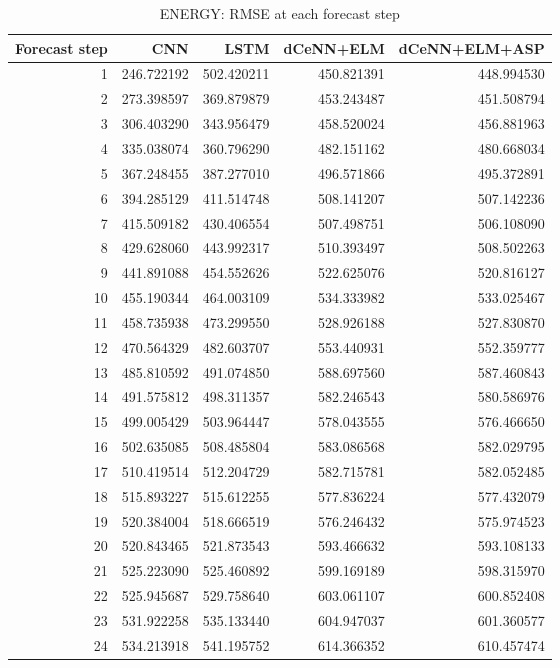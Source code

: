\begin{table}
\caption{ENERGY: RMSE at each forecast step}
\begin{tabular}{rrrrr}
\toprule
Forecast step & CNN & LSTM & dCeNN+ELM & dCeNN+ELM+ASP \\
\midrule
1 & 246.722192 & 502.420211 & 450.821391 & 448.994530 \\
2 & 273.398597 & 369.879879 & 453.243487 & 451.508794 \\
3 & 306.403290 & 343.956479 & 458.520024 & 456.881963 \\
4 & 335.038074 & 360.796290 & 482.151162 & 480.668034 \\
5 & 367.248455 & 387.277010 & 496.571866 & 495.372891 \\
6 & 394.285129 & 411.514748 & 508.141207 & 507.142236 \\
7 & 415.509182 & 430.406554 & 507.498751 & 506.108090 \\
8 & 429.628060 & 443.992317 & 510.393497 & 508.502263 \\
9 & 441.891088 & 454.552626 & 522.625076 & 520.816127 \\
10 & 455.190344 & 464.003109 & 534.333982 & 533.025467 \\
11 & 458.735938 & 473.299550 & 528.926188 & 527.830870 \\
12 & 470.564329 & 482.603707 & 553.440931 & 552.359777 \\
13 & 485.810592 & 491.074850 & 588.697560 & 587.460843 \\
14 & 491.575812 & 498.311357 & 582.246543 & 580.586976 \\
15 & 499.005429 & 503.964447 & 578.043555 & 576.466650 \\
16 & 502.635085 & 508.485804 & 583.086568 & 582.029795 \\
17 & 510.419514 & 512.204729 & 582.715781 & 582.052485 \\
18 & 515.893227 & 515.612255 & 577.836224 & 577.432079 \\
19 & 520.384004 & 518.666519 & 576.246432 & 575.974523 \\
20 & 520.843465 & 521.873543 & 593.466632 & 593.108133 \\
21 & 525.223090 & 525.460892 & 599.169189 & 598.315970 \\
22 & 525.945687 & 529.758640 & 603.061107 & 600.852408 \\
23 & 531.922258 & 535.133440 & 604.947037 & 601.360577 \\
24 & 534.213918 & 541.195752 & 614.366352 & 610.457474 \\

\end{tabular}
\end{table}
